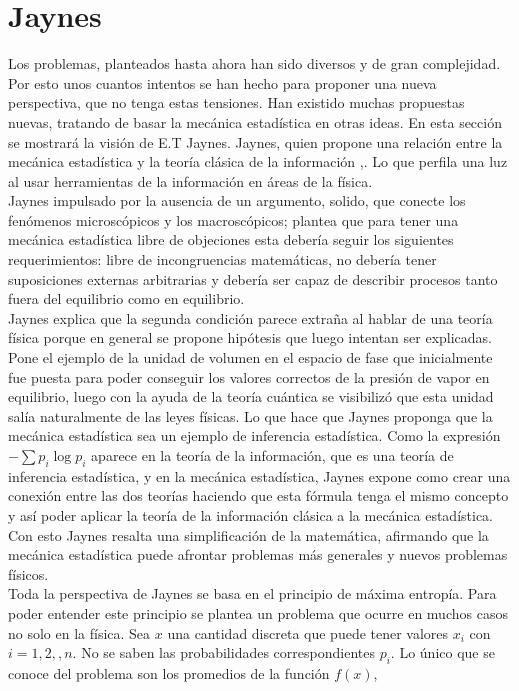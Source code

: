 \section{Jaynes}
Los problemas, planteados hasta ahora han sido diversos y de gran complejidad. Por esto unos cuantos intentos se han hecho para proponer una nueva perspectiva, que no tenga estas tensiones. Han existido muchas propuestas nuevas, tratando de basar la mecánica estadística en otras ideas. En esta sección se mostrará la visión de E.T Jaynes. Jaynes, quien propone una relación entre la mecánica estadística y la teoría clásica de la información \cite{JaynesI},\cite{JaynesII}. Lo que perfila una luz al usar herramientas de la información en áreas de la física.
\\
Jaynes impulsado por la ausencia de un argumento, solido, que conecte los fenómenos microscópicos y los macroscópicos; plantea que para tener una mecánica estadística libre de objeciones esta debería seguir los siguientes requerimientos: libre de incongruencias matemáticas, no debería tener suposiciones externas arbitrarias y debería ser capaz de describir procesos tanto fuera del equilibrio como en equilibrio.
\\
Jaynes explica que la segunda condición parece extraña al hablar de una teoría física porque en general se propone hipótesis que luego intentan ser explicadas. Pone el ejemplo de la unidad de volumen en el espacio de fase que inicialmente fue puesta para poder conseguir los valores correctos de la presión de vapor en equilibrio, luego con la ayuda de la teoría cuántica se visibilizó que esta unidad salía naturalmente de las leyes físicas. Lo que hace que Jaynes proponga que la mecánica estadística sea un ejemplo de inferencia estadística. Como la expresión $- \sum p_{i} \log p_{i}$ aparece en la teoría de la información, que es una teoría de inferencia estadística, y en la mecánica estadística, Jaynes expone como crear una conexión entre las dos teorías haciendo que esta fórmula tenga el mismo concepto y así poder aplicar la teoría de la información clásica a la mecánica estadística. Con esto Jaynes resalta   una simplificación de la matemática, afirmando que la mecánica estadística puede afrontar problemas más generales y nuevos problemas físicos.
\\
Toda la perspectiva de Jaynes se basa en el principio de máxima entropía. Para poder entender este principio se plantea un problema que ocurre en muchos casos no solo en la física. Sea $x$ una cantidad discreta que puede tener valores $x_{i}$ con $i=1, 2,,n$. No se saben las probabilidades correspondientes $p_{i}$. Lo único que se conoce del problema son los promedios de la función $f(x)$,
